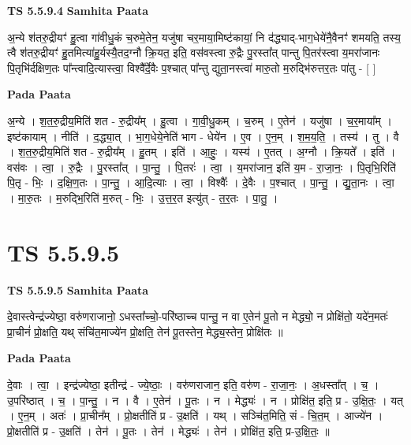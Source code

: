 \documentclass[17pt]{extarticle}
\begin{document}
\textbf{TS 5.5.9.4 } \newline
\textbf{Samhita Paata} \newline

अ॒न्ये श॑तरु॒द्रीयꣳ॑ हु॒त्वा गा॑वीधु॒कं च॒रुमे॒तेन॒ यजु॑षा चर॒माया॒मिष्ट॑कायां॒ नि द॑द्ध्याद्-भाग॒धेये॑नै॒वैनꣳ॑ शमयति॒ तस्य॒ त्वै श॑तरु॒द्रीयꣳ॑ हु॒तमित्या॑हु॒र्यस्यै॒तद॒ग्नौ क्रि॒यत॒ इति॒ वस॑वस्त्वा रु॒द्रैः पु॒रस्ता᳚त् पान्तु पि॒तर॑स्त्वा य॒मरा॑जानः पि॒तृभि॑र्दक्षिण॒तः पा᳚न्त्वादि॒त्यास्त्वा॒ विश्वै᳚र्दे॒वैः प॒श्चात् पा᳚न्तु द्युता॒नस्त्वा॑ मारु॒तो म॒रुद्भि॑रुत्तर॒तः पा॑तु - [  ] \newline

\textbf{Pada Paata} \newline

अ॒न्ये । श॒त॒रु॒द्रीय॒मिति॑ शत - रु॒द्रीय᳚म् । हु॒त्वा । गा॒वी॒धु॒कम् । च॒रुम् । ए॒तेन॑ । यजु॑षा । च॒र॒माया᳚म् । इष्ट॑कायाम् । नीति॑ । द॒द्ध्या॒त् । भा॒ग॒धेये॒नेति॑ भाग - धेये॑न । ए॒व । ए॒न॒म् । श॒म॒य॒ति॒ । तस्य॑ । तु । वै । श॒त॒रु॒द्रीय॒मिति॑ शत - रु॒द्रीय᳚म् । हु॒तम् । इति॑ । आ॒हुः॒ । यस्य॑ । ए॒तत् । अ॒ग्नौ । क्रि॒यते᳚ । इति॑ । वस॑वः । त्वा॒ । रु॒द्रैः । पु॒रस्ता᳚त् । पा॒न्तु॒ । पि॒तरः॑ । त्वा॒ । य॒मरा॑जान॒ इति॑ य॒म - रा॒जा॒नः॒ । पि॒तृभि॒रिति॑ पि॒तृ - भिः॒ । द॒क्षि॒ण॒तः । पा॒न्तु॒ । आ॒दि॒त्याः । त्वा॒ । विश्वैः᳚ । दे॒वैः । प॒श्चात् । पा॒न्तु॒ । द्यु॒ता॒नः । त्वा॒ । मा॒रु॒तः । म॒रुद्भि॒रिति॑ म॒रुत् - भिः॒ । उ॒त्त॒र॒त इत्यु॑त् - त॒र॒तः । पा॒तु॒ ।  \newline





\section{ TS 5.5.9.5 }

\textbf{TS 5.5.9.5 } \newline
\textbf{Samhita Paata} \newline

दे॒वास्त्वेन्द्र॑ज्येष्ठा॒ वरु॑णराजानो॒ ऽधस्ता᳚च्चो॒-परि॑ष्ठाच्च पान्तु॒ न वा ए॒तेन॑ पू॒तो न मेद्ध्यो॒ न प्रोक्षि॑तो॒ यदे॑न॒मतः॑ प्रा॒चीनं॑ प्रो॒क्षति॒ यथ् संचि॑त॒माज्ये॑न प्रो॒क्षति॒ तेन॑ पू॒तस्तेन॒ मेद्ध्य॒स्तेन॒ प्रोक्षि॑तः ॥ \newline

\textbf{Pada Paata} \newline

दे॒वाः । त्वा॒ । इन्द्र॑ज्येष्ठा॒ इतीन्द्र॑ - ज्ये॒ष्ठाः॒ । वरु॑णराजान॒ इति॒ वरु॑ण - रा॒जा॒नः॒ । अ॒धस्ता᳚त् । च॒ । उ॒परि॑ष्ठात् । च॒ । पा॒न्तु॒ । न । वै । ए॒तेन॑ । पू॒तः । न । मेद्ध्यः॑ । न । प्रोक्षि॑त॒ इति॒ प्र - उ॒क्षि॒तः॒ । यत् । ए॒न॒म् । अतः॑ । प्रा॒चीन᳚म् । प्रो॒क्षतीति॑ प्र - उ॒क्षति॑ । यथ् । सञ्चि॑त॒मिति॒ सं - चि॒त॒म् । आज्ये॑न । प्रो॒क्षतीति॑ प्र - उ॒क्षति॑ । तेन॑ । पू॒तः । तेन॑ । मेद्ध्यः॑ । तेन॑ । प्रोक्षि॑त॒ इति॒ प्र-उ॒क्षि॒तः॒ ॥  \newline
\end{document}
